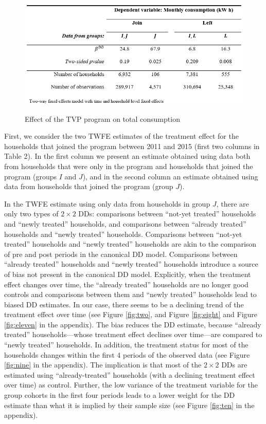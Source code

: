 \documentclass[12pt]{article}
\begin{document}
\begin{figure}[ht]
  \caption{Effect of the TVP program on total consumption}\label{fig:table3}
  \begin{center}
  {\includegraphics[width=1\textwidth]{./figures/table3.png}}
  \end{center}
\end{figure}


First, we consider the two TWFE estimates of the treatment effect for the households that joined the program between 2011 and 2015 (first two columns in Table 2). In the first column we present an estimate obtained using data both from households that were only in the program and households that joined the program (groups $I$ and $J$), and in the second column an estimate obtained using data from households that joined the program (group $J$).

In the TWFE estimate using only data from households in group $J$, there are only two types of $2 \times 2$ DDs: comparisons between \enquote{not-yet treated} households and \enquote{newly treated} households, and comparisons between \enquote{already treated} households and \enquote{newly treated}  households. Comparisons between \enquote{not-yet treated} households and \enquote{newly treated} households are akin to the comparison of pre and post periods in the canonical DD model. Comparisons between \enquote{already treated} households and \enquote{newly treated} households introduce a source of bias not present in the canonical DD model. Explicitly, when the treatment effect changes over time, the \enquote{already treated} households are no longer good controls and comparisons between them and \enquote{newly treated} households lead to biased DD estimates. In our case, there seems to be a declining trend of the treatment effect over time (see Figure \ref{fig:two}, and Figure \ref{fig:eight} and Figure \ref{fig:eleven} in the appendix). The bias reduces the DD estimate, because \enquote{already treated} households---whose treatment effect declines over time---are compared to \enquote{newly treated} households. In addition, the treatment status for most of the households changes within the first 4 periods of the observed data (see Figure \ref{fig:nine} in the appendix). The implication is that most of the  $2 \times 2$ DDs are estimated using \enquote{already-treated} households (with a declining treatment effect over time) as control. Further, the low variance of the treatment variable for the group cohorts in the first four periods leads to a lower weight for the DD estimate than what it is implied by their sample size (see Figure \ref{fig:ten} in the appendix).
\end{document}
